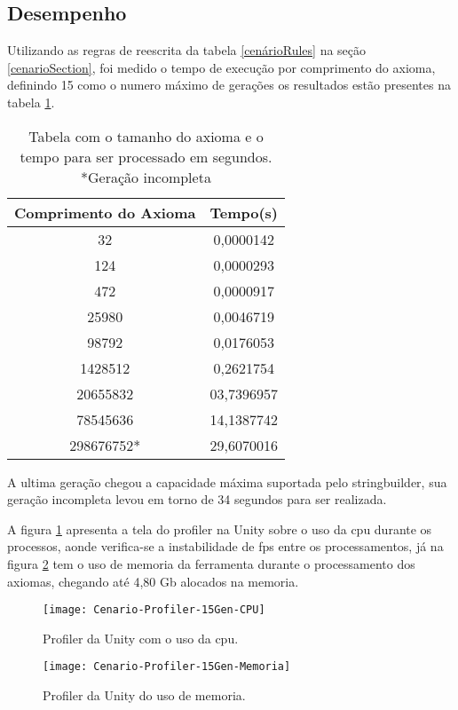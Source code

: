 \subsection{Desempenho}
Utilizando as regras de reescrita da tabela \ref{cenárioRules} na seção \ref{cenarioSection}, foi medido o tempo de execução por comprimento do axioma, definindo 15 como o numero máximo de gerações os resultados estão presentes na tabela  \ref{axiomaTempoTabela}.

\begin{table}[!h]
	\centering
	\begin{tabular}{|c|c|}
		\hline
		\textbf{Comprimento do Axioma} & \textbf{Tempo(s)} \\ \hline
		32                             & 0,0000142         \\ \hline
		124                            & 0,0000293         \\ \hline
		472                            & 0,0000917         \\ \hline
		25980                          & 0,0046719         \\ \hline
		98792                          & 0,0176053         \\ \hline
		1428512                        & 0,2621754         \\ \hline
		20655832                       & 03,7396957        \\ \hline
		78545636                       & 14,1387742        \\ \hline
		298676752*                     & 29,6070016        \\ \hline
	\end{tabular}
	\caption{Tabela com o tamanho do axioma e o tempo para ser processado em segundos. *Geração incompleta}
	\label{axiomaTempoTabela}
\end{table}

A ultima geração chegou a capacidade máxima suportada pelo stringbuilder, sua geração incompleta levou em torno de 34 segundos para ser realizada.

A figura \ref{profilerCPU} apresenta a tela do profiler na Unity sobre o uso da cpu durante os processos, aonde verifica-se a instabilidade de fps entre os processamentos, já na figura \ref{profilerMemoria} tem o uso de memoria da ferramenta durante o processamento dos axiomas, chegando até 4,80 Gb alocados na memoria.
\begin{figure}[]
	\centering
	\texttt{[image: Cenario-Profiler-15Gen-CPU]}
	\caption{Profiler da Unity com o uso da cpu.}
	\label{profilerCPU}
\end{figure}

\begin{figure}[]
	\centering
	\texttt{[image: Cenario-Profiler-15Gen-Memoria]}
	\caption{Profiler da Unity do uso de memoria.}
	\label{profilerMemoria}
\end{figure}